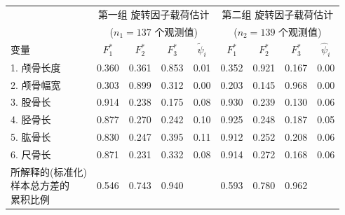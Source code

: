 \begin{mvtable}
\label{tab:9.11}
\small
\begin{tabular}{lcccc|cccc}
\toprule
& \multicolumn{4}{c}{第一组 旋转因子载荷估计} & \multicolumn{4}{c}{第二组 旋转因子载荷估计}\\
& \multicolumn{4}{c}{($n_1=137$ 个观测值)} & \multicolumn{4}{c}{($n_2=139$ 个观测值)}\\
\cmidrule(r){2-5}\cmidrule(l){6-9}
变\quad 量 & $F_1^{*}$ & $F_2^{*}$ & $F_3^{*}$ & $\tilde{\psi}_i$ & $F_1^{*}$ & $F_2^{*}$ & $F_3^{*}$ & $\hat{\psi}_i$\\
\midrule
1. 颅骨长度 & 0.360 & 0.361 & 0.853 & 0.01 & 0.352 & 0.921 & 0.167 & 0.00\\
2. 颅骨幅宽 & 0.303 & 0.899 & 0.312 & 0.00 & 0.203 & 0.145 & 0.968 & 0.00\\
3. 股骨长 & 0.914 & 0.238 & 0.175 & 0.08 & 0.930 & 0.239 & 0.130 & 0.06\\
4. 胫骨长 & 0.877 & 0.270 & 0.242 & 0.10 & 0.925 & 0.248 & 0.187 & 0.05\\
5. 肱骨长 & 0.830 & 0.247 & 0.395 & 0.11 & 0.912 & 0.252 & 0.208 & 0.06\\
6. 尺骨长 & 0.871 & 0.231 & 0.332 & 0.08 & 0.914 & 0.272 & 0.168 & 0.06\\
\midrule
\makecell[l]{所解释的(标准化)\\样本总方差的\\累积比例}
 & 0.546 & 0.743 & 0.940 & & 0.593 & 0.780 & 0.962 & \\
\bottomrule
\end{tabular}
\end{mvtable}

